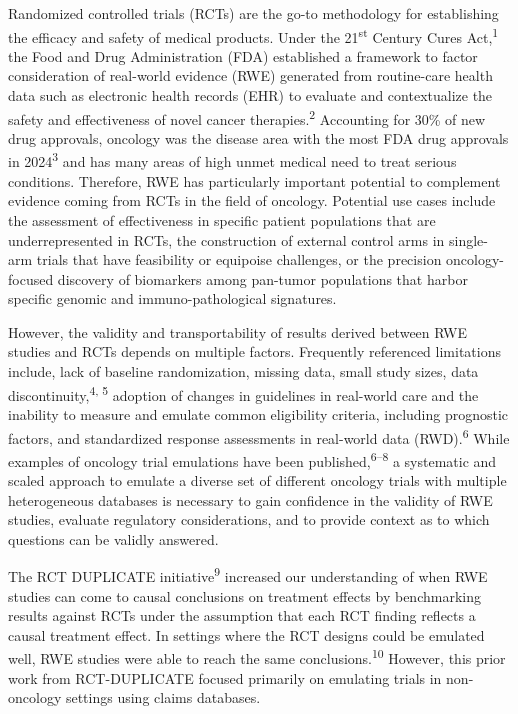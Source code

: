 \documentclass[
  letterpaper,
  DIV=11,
  numbers=noendperiod]{scrartcl}
\begin{document}
Randomized controlled trials (RCTs) are the go-to methodology for
establishing the efficacy and safety of medical products. Under the
21\textsuperscript{st} Century Cures Act,\textsuperscript{1} the Food
and Drug Administration (FDA) established a framework to factor
consideration of real-world evidence (RWE) generated from routine-care
health data such as electronic health records (EHR) to evaluate and
contextualize the safety and effectiveness of novel cancer
therapies.\textsuperscript{2} Accounting for 30\% of new drug approvals,
oncology was the disease area with the most FDA drug approvals in
2024\textsuperscript{3} and has many areas of high unmet medical need to
treat serious conditions. Therefore, RWE has particularly important
potential to complement evidence coming from RCTs in the field of
oncology. Potential use cases include the assessment of effectiveness in
specific patient populations that are underrepresented in RCTs, the
construction of external control arms in single-arm trials that have
feasibility or equipoise challenges, or the precision oncology-focused
discovery of biomarkers among pan-tumor populations that harbor specific
genomic and immuno-pathological signatures.

However, the validity and transportability of results derived between
RWE studies and RCTs depends on multiple factors. Frequently referenced
limitations include, lack of baseline randomization, missing data, small
study sizes, data discontinuity,\textsuperscript{4, 5} adoption of
changes in guidelines in real-world care and the inability to measure
and emulate common eligibility criteria, including prognostic factors,
and standardized response assessments in real-world data
(RWD).\textsuperscript{6} While examples of oncology trial emulations
have been published,\textsuperscript{6--8} a systematic and scaled
approach to emulate a diverse set of different oncology trials with
multiple heterogeneous databases is necessary to gain confidence in the
validity of RWE studies, evaluate regulatory considerations, and to
provide context as to which questions can be validly answered.

The RCT DUPLICATE initiative\textsuperscript{9} increased our
understanding of when RWE studies can come to causal conclusions on
treatment effects by benchmarking results against RCTs under the
assumption that each RCT finding reflects a causal treatment effect. In
settings where the RCT designs could be emulated well, RWE studies were
able to reach the same conclusions.\textsuperscript{10} However, this
prior work from RCT-DUPLICATE focused primarily on emulating trials in
non-oncology settings using claims databases.
\end{document}
